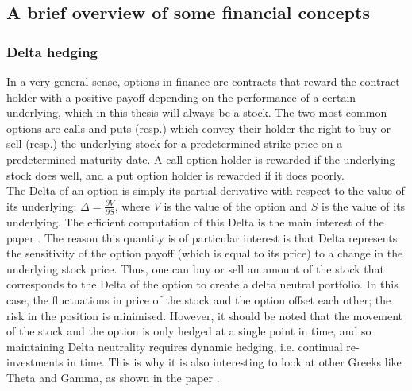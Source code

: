\documentclass[a4paper,12pt]{article}
\begin{document}
\subsection{A brief overview of some financial concepts}
\subsubsection{Delta hedging}
In a very general sense, options in finance are contracts that reward the contract holder with a positive payoff depending on the performance of a certain underlying, which in this thesis will always be a stock. The two most common options are calls and puts (resp.) which convey their holder the right to buy or sell (resp.) the underlying stock for a predetermined strike price on a predetermined maturity date. A call option holder is rewarded if the underlying stock does well, and a put option holder is rewarded if it does poorly.\\
The Delta of an option is simply its partial derivative with respect to the value of its underlying: $\Delta = \frac{\partial V}{\partial S}$, where $V$ is the value of the option and $S$ is the value of its underlying. The efficient computation of this Delta is the main interest of the paper \cite{Ludkovski2020}. The reason this quantity is of particular interest is that Delta represents the sensitivity of the option payoff (which is equal to its price) to a change in the underlying stock price. Thus, one can buy or sell an amount of the stock that corresponds to the Delta of the option to create a delta neutral portfolio. In this case, the fluctuations in price of the stock and the option offset each other; the risk in the position is minimised. However, it should be noted that the movement of the stock and the option is only hedged at a single point in time, and so maintaining Delta neutrality requires dynamic hedging, i.e. continual re-investments in time. This is why it is also interesting to look at other Greeks like Theta and Gamma, as shown in the paper \cite{Ludkovski2020}.
\end{document}
